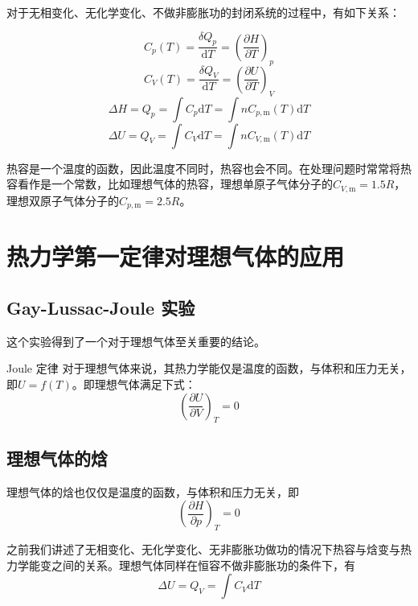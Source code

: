 \documentclass[lang=cn,newtx,11pt,scheme=chinese]{elegantbook}
\begin{document}
对于无相变化、无化学变化、不做非膨胀功的封闭系统的过程中，有如下关系：

\begin{equation}
	C_p(T)=\frac{ \delta Q_p }{\mathrm{d}T } =\left ( \frac{\partial H}{\partial T}  \right )_p
\end{equation}
\begin{equation}
	C_V(T)=\frac{ \delta Q_V }{\mathrm{d}T } =\left ( \frac{\partial U}{\partial T}  \right )_V
\end{equation}
\begin{equation}
	\Delta H=Q_p=\int C_p\mathrm{d}T=\int nC_{p,\mathrm{m} }(T)\mathrm{d}T 
\end{equation}
\begin{equation}
	\Delta U=Q_V=\int C_V\mathrm{d}T=\int nC_{V,\mathrm{m} }(T)\mathrm{d}T 
\end{equation}

热容是一个温度的函数，因此温度不同时，热容也会不同。在处理问题时常常将热容看作是一个常数，比如理想气体的热容，理想单原子气体分子的$C_{V,\mathrm{m}}=1.5R$，理想双原子气体分子的$C_{p,\mathrm{m}}=2.5R$。

\section{热力学第一定律对理想气体的应用}
\subsection{Gay-Lussac-Joule 实验}
这个实验得到了一个对于理想气体至关重要的结论。
\begin{theorem}{Joule 定律}
	对于理想气体来说，其热力学能仅是温度的函数，与体积和压力无关，即$U=f(T)$。即理想气体满足下式：
	\begin{equation}
		\left ( \frac{\partial U}{\partial V}  \right )_T=0
	\end{equation}
\end{theorem}

\subsection{理想气体的焓}
理想气体的焓也仅仅是温度的函数，与体积和压力无关，即
\begin{equation}
	\left ( \frac{\partial H}{\partial p}  \right )_T=0
\end{equation}

之前我们讲述了无相变化、无化学变化、无非膨胀功做功的情况下热容与焓变与热力学能变之间的关系。理想气体同样在恒容不做非膨胀功的条件下，有
\begin{equation}
	\Delta U=Q_V=\int C_V \mathrm{d}T
\end{equation}
\end{document}
